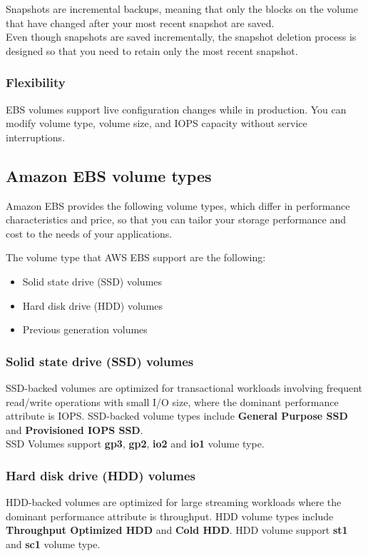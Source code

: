\documentclass[12pt, letterpaper, twoside]{article}
\begin{document}
Snapshots are incremental backups, meaning that only the blocks on the volume that have changed after your most recent snapshot are saved.\\
Even though snapshots are saved incrementally, the snapshot deletion process is designed so that you need to retain only the most recent 
snapshot.\\

\subsubsection{Flexibility}
EBS volumes support live configuration changes while in production. You can modify volume type, volume size, and IOPS capacity without 
service interruptions.\\


\subsection{Amazon EBS volume types}
Amazon EBS provides the following volume types, which differ in performance characteristics and price, so that you can tailor your storage 
performance and cost to the needs of your applications.

The volume type that AWS EBS support are the following:

\begin{itemize}
	\item Solid state drive (SSD) volumes

	\item Hard disk drive (HDD) volumes

	\item Previous generation volumes
\end{itemize}

\subsubsection{Solid state drive (SSD) volumes}
SSD-backed volumes are optimized for transactional workloads involving frequent read/write operations with small I/O size, where the dominant 
performance attribute is IOPS. SSD-backed volume types include \textbf{General Purpose SSD} and \textbf{Provisioned IOPS SSD}.\\
SSD Volumes support \textbf{gp3}, \textbf{gp2}, \textbf{io2} and \textbf{io1} volume type.

\subsubsection{Hard disk drive (HDD) volumes}
HDD-backed volumes are optimized for large streaming workloads where the dominant performance attribute is throughput. HDD volume types include 
\textbf{Throughput Optimized HDD} and \textbf{Cold HDD}.
HDD volume support \textbf{st1} and \textbf{sc1} volume type.
\end{document}
